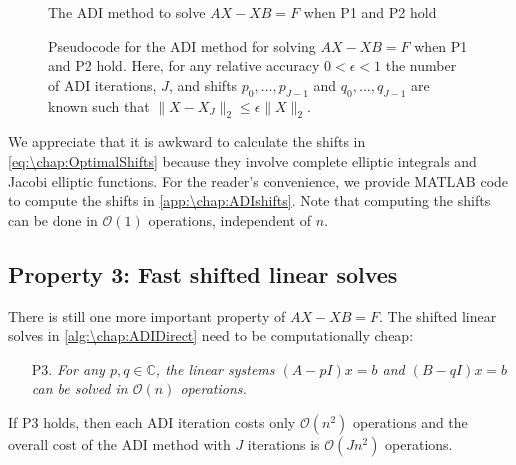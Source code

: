 \begin{figure}
\begin{algorithm}[H]
\caption{The ADI method to solve $AX-XB = F$ when P1 and P2 hold}
\begin{algorithmic}[1]
\EndFor
{}
\end{algorithmic}
\label{alg:\chap:ADIDirect}
\end{algorithm}
\vspace{-1.5em}
\caption{Pseudocode for the ADI method for solving $AX-XB=F$ when P1 and P2 hold. Here, for any relative accuracy $0<\epsilon<1$ the number of ADI iterations, $J$, and shifts $p_0,\ldots,p_{J-1}$ and $q_0,\ldots,q_{J-1}$ are known such that $\|X-X_J\|_2\leq \epsilon\|X\|_2$.}
\label{fig:\chap:ADIDirect}
\end{figure}

We appreciate that it is awkward to calculate the shifts in \cref{eq:\chap:OptimalShifts} because they involve complete elliptic integrals and Jacobi elliptic functions. For the reader's convenience, we provide MATLAB code to compute the shifts in \cref{app:\chap:ADIshifts}. Note that computing the shifts can be done in $\mathcal{O}(1)$ operations, independent of $n$.

\subsection*{Property 3: Fast shifted linear solves} 
There is still one more important property of $AX-XB=F$. The shifted linear solves in \cref{alg:\chap:ADIDirect} need to be computationally cheap:
\vspace{1em}
\begin{enumerate}
\item[P3.] \emph{For any $p,q\in\mathbb{C}$, the linear systems $(A-pI)x=b$ and $(B-qI)x=b$ can be solved in $\mathcal{O}(n)$ operations.}
\end{enumerate}
\vspace{1em}
If P3 holds, then each ADI iteration costs only $\mathcal{O}(n^2)$ operations and the overall cost of the ADI method with $J$ iterations is $\mathcal{O}(Jn^2)$ operations.    


